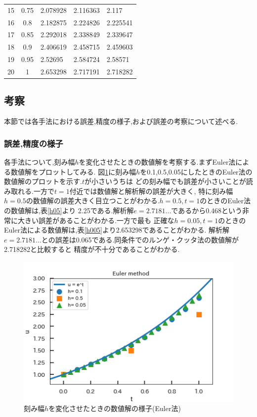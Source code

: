 \documentclass[dvipdfmx]{jarticle}
\begin{document}
\begin{table}[H]
\begin{center}
\begin{tabular}{r|c|l|l|l}
          15 & 0.75 & 2.078928 & 2.116363 & 2.117 \\
          16 & 0.8 & 2.182875 & 2.224826 & 2.225541 \\
          17 & 0.85 & 2.292018 & 2.338849 & 2.339647 \\
          18 & 0.9 & 2.406619 & 2.458715 & 2.459603 \\
          19 & 0.95 & 2.52695 & 2.584724 & 2.58571 \\
          20 & 1 & 2.653298 & 2.717191 & 2.718282 \\ \hline
        \end{tabular}
    \end{center}
    \end{table}



    \subsection{考察}
    本節では各手法における誤差,精度の様子,および誤差の考察について述べる.
    \subsubsection{誤差,精度の様子}
    各手法について,刻み幅$h$を変化させたときの数値解を考察する.まずEuler法による数値解をプロットしてみる.
    図\ref{eulerplt}に刻み幅$h$を0.1,0.5,0.05にしたときのEuler法の数値解のプロットを示す.$t$が小さいうちは
    どの刻み幅でも誤差が小さいことが読み取れる.一方で$t=1$付近では数値解と解析解の誤差が大きく,
    特に刻み幅$h=0.5$の数値解の誤差大きく目立つことがわかる.$h=0.5,t=1$のときのEuler法の数値解は,表\ref{h05}より
    2.25である.解析解$e=2.7181...$であるから0.468という非常に大きい誤差があることがわかる.一方で最も
    正確な$h=0.05,t=1$のときのEuler法による数値解は,表\ref{h005}より2.653298であることがわかる.
    解析解$e=2.7181...$との誤差は0.065である.同条件でのルンゲ・クッタ法の数値解が2.718282と比較すると
    精度が不十分であることがわかる.

    \begin{figure}[H]
      \centering
      \includegraphics[scale=0.75]{kadai3.png}
      \caption{刻み幅$h$を変化させたときの数値解の様子(Euler法)}
       \label{eulerplt}
      \end{figure}
\end{document}
